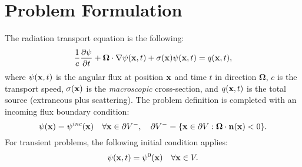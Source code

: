 \section{Problem Formulation}
The radiation transport equation is the following:
\begin{equation}\label{tr}
  \frac{1}{c}\frac{\partial \psi}{\partial t} + \mathbf{\Omega}\cdot\nabla\psi(\mathbf{x},t)
  + \sigma(\mathbf{x})\psi(\mathbf{x},t) = q(\mathbf{x},t),
\end{equation}
where $\psi(\mathbf{x},t)$ is the angular flux at position $\mathbf{x}$ and time
$t$ in direction $\mathbf{\Omega}$, $c$ is the transport speed, $\sigma(\mathbf{x})$
is the \emph{macroscopic} cross-section, and $q(\mathbf{x},t)$ is the
total source (extraneous plus scattering).
The problem definition is completed with an incoming flux boundary condition:
\begin{equation}
   \psi(\mathbf{x}) = \psi^{inc}(\mathbf{x})  \quad \forall \mathbf{x}\in \partial V^-,
     \quad \partial V^- = \{\mathbf{x}\in\partial V:
     \mathbf{\Omega}\cdot\mathbf{n}(\mathbf{x})<0\}.
\end{equation}
For transient problems, the following initial condition applies:
\begin{equation}
   \psi(\mathbf{x},t) = \psi^0(\mathbf{x})  \quad \forall \mathbf{x}\in V.
\end{equation}
